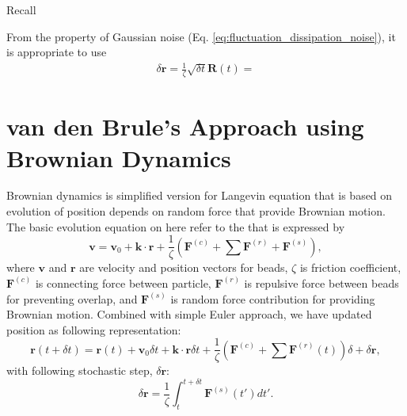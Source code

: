 \documentclass[10pt, a4paper]{article}
\begin{document}
Recall

From the property of Gaussian noise (Eq. \eqref{eq:fluctuation_dissipation_noise}), it is appropriate to use 
\begin{align}
\delta \mathbf{r} = \frac{1}{\zeta}\sqrt{\delta t}\mathbf{R}(t) = 
\end{align}


\section{van den Brule's Approach using Brownian Dynamics}
Brownian dynamics is simplified version for Langevin equation that is based on evolution of position depends on random force that provide Brownian motion. The basic evolution equation on here refer to the \textcite{VandenBrule:1995fq} that is expressed by
\begin{equation}
\mathbf{v} = \mathbf{v}_0 + \mathbf{k}\cdot\mathbf{r} + \frac{1}{\zeta}\left(\mathbf{F}^{(c)} + \sum\mathbf{F}^{(r)} + \mathbf{F}^{(s)}\right),
\end{equation}
where $\mathbf{v}$ and $\mathbf{r}$ are velocity and position vectors for beads, $\zeta$ is friction coefficient, $\mathbf{F}^{(c)}$ is connecting force between particle, $\mathbf{F}^{(r)}$ is repulsive force between beads for preventing overlap, and $\mathbf{F}^{(s)}$ is random force contribution for providing Brownian motion. 
Combined with simple Euler approach, we have updated position as following representation:
\begin{equation}
\mathbf{r}(t + \delta t) = \mathbf{r}(t) + \mathbf{v}_0\delta t + \mathbf{k}\cdot\mathbf{r}\delta t + \frac{1}{\zeta}\left(\mathbf{F}^{(c)} + \sum\mathbf{F}^{(r)}(t)\right)\delta + \delta \mathbf{r},\label{eq:update_position}
\end{equation}
with following stochastic step, $\delta \mathbf{r}$:
\begin{equation}
\delta \mathbf{r} = \frac{1}{\zeta} \int_{t}^{t+\delta t}\mathbf{F}^{(s)}(t')dt'.\label{eq:stochastic_step}
\end{equation}
\end{document}
